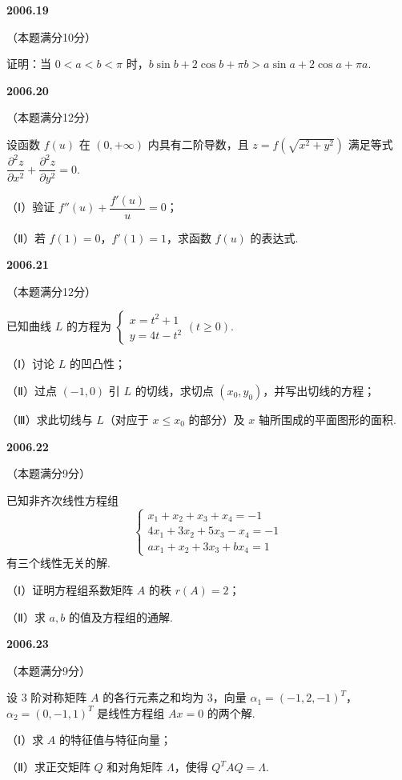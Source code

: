 \documentclass[UTF8,12pt,fontset=windows]{ctexart}
\begin{document}
\vfill
\newpage
{\large\bfseries 2006.19}

（本题满分10分）

证明：当 $0 < a < b < \pi$ 时，$b\sin b + 2\cos b + \pi b > a\sin a + 2\cos a + \pi a$.

\vfill
\newpage
{\large\bfseries 2006.20}

（本题满分12分）

设函数 $f(u)$ 在 $(0,+\infty)$ 内具有二阶导数，且 $z = f\left(\sqrt{x^2+y^2}\right)$ 满足等式 $\dfrac{\partial^2 z}{\partial x^2} + \dfrac{\partial^2 z}{\partial y^2} = 0$.

（Ⅰ）验证 $f''(u) + \dfrac{f'(u)}{u} = 0$；

（Ⅱ）若 $f(1) = 0$，$f'(1) = 1$，求函数 $f(u)$ 的表达式.

\vfill
\newpage
{\large\bfseries 2006.21}

（本题满分12分）

已知曲线 $L$ 的方程为 $\begin{cases} x = t^2+1 \\ y = 4t-t^2 \end{cases}(t \geqslant 0)$.

（Ⅰ）讨论 $L$ 的凹凸性；

（Ⅱ）过点 $(-1,0)$ 引 $L$ 的切线，求切点 $(x_0,y_0)$，并写出切线的方程；

（Ⅲ）求此切线与 $L$（对应于 $x \leqslant x_0$ 的部分）及 $x$ 轴所围成的平面图形的面积.

\vfill
\newpage
{\large\bfseries 2006.22}

（本题满分9分）

已知非齐次线性方程组
$$\begin{cases} x_1+x_2+x_3+x_4 = -1 \\ 4x_1+3x_2+5x_3-x_4 = -1 \\ ax_1+x_2+3x_3+bx_4 = 1 \end{cases}$$
有三个线性无关的解.

（Ⅰ）证明方程组系数矩阵 $A$ 的秩 $r(A) = 2$；

（Ⅱ）求 $a,b$ 的值及方程组的通解.

\vfill
\newpage
{\large\bfseries 2006.23}

（本题满分9分）

设 3 阶对称矩阵 $A$ 的各行元素之和均为 3，向量 $\alpha_1 = (-1,2,-1)^T$，$\alpha_2 = (0,-1,1)^T$ 是线性方程组 $Ax = 0$ 的两个解.

（Ⅰ）求 $A$ 的特征值与特征向量；

（Ⅱ）求正交矩阵 $Q$ 和对角矩阵 $\Lambda$，使得 $Q^TAQ = \Lambda$.

\vfill
\end{document}
